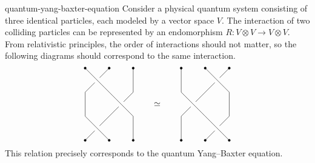 \begin{example}{quantum-yang-baxter-equation}
    Consider a physical quantum system consisting of three identical particles, each modeled by a vector space $V$. The interaction of two colliding particles can be represented by an endomorphism $R \colon V \otimes V \to V \otimes V$. From relativistic principles, the order of interactions should not matter, so the following diagrams should correspond to the same interaction.
    \[ \svg \begin{tikzpicture}
        \begin{scope}
            \draw[black,fill=black] (0, 0) circle (.3ex);
            \draw[black,fill=black] (1, 0) circle (.3ex);
            \draw[black,fill=black] (2, 0) circle (.3ex);
            \draw[black,fill=black] (0, 3) circle (.3ex);
            \draw[black,fill=black] (1, 3) circle (.3ex);
            \draw[black,fill=black] (2, 3) circle (.3ex);
            \draw (0, 3) -- (1, 2) -- (2, 1) -- (2, 0);
            \draw (1, 3) -- (0.6, 2.6);
            \draw (0.4, 2.4) -- (0, 2) -- (0, 1) -- (1, 0);
            \draw (2, 3) -- (2, 2) -- (1.6, 1.6);
            \draw (1.4, 1.4) -- (0.6, 0.6);
            \draw (0.4, 0.4) -- (0, 0);
        \end{scope}
        \node at (3cm,1.5cm) {$\simeq$};
        \begin{scope}[xshift=4cm]
            \draw[black,fill=black] (0, 0) circle (.3ex);
            \draw[black,fill=black] (1, 0) circle (.3ex);
            \draw[black,fill=black] (2, 0) circle (.3ex);
            \draw[black,fill=black] (0, 3) circle (.3ex);
            \draw[black,fill=black] (1, 3) circle (.3ex);
            \draw[black,fill=black] (2, 3) circle (.3ex);
            \draw (0, 3) -- (0, 2) -- (1, 1) -- (2, 0);
            \draw (1, 3) -- (2, 2) -- (2, 1) -- (1.6, 0.6);
            \draw (1.4, 0.4) -- (1, 0);
            \draw (2, 3) -- (1.6, 2.6);
            \draw (1.4, 2.4) -- (0.6, 1.6);
            \draw (0.4, 1.4) -- (0, 1) -- (0, 0);
        \end{scope}
    \end{tikzpicture} \]
    This relation precisely corresponds to the quantum Yang--Baxter equation.
\end{example}
